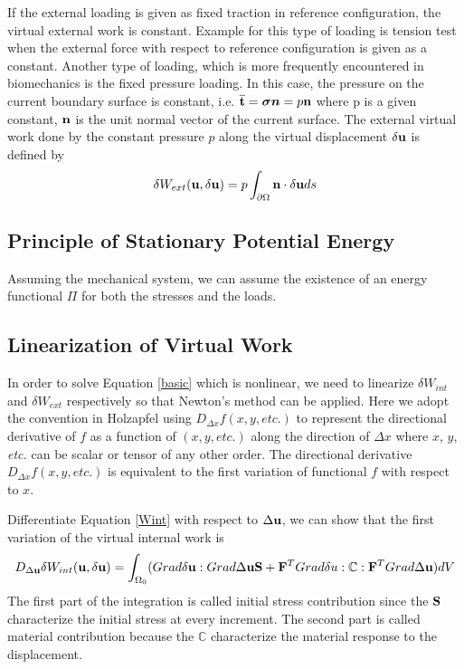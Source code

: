 If the external loading is given as fixed traction in reference configuration, the virtual external work is constant. Example for this type of loading is tension test when the external force with respect to reference configuration is given as a constant. Another type of loading, which is more frequently encountered in biomechanics is the fixed pressure loading.
In this case, the pressure on the current boundary surface is constant, i.e. $\overline{\bold{t}} = \boldsymbol{\sigma{n}} = p\bold{n}$ where p is a given constant, $\bold{n}$ is the unit normal vector of the current surface. The external virtual work done by the constant pressure $p$ along the virtual displacement $\delta{\bold{u}}$ is defined by
\begin{equation} \label{Wext2}
\delta{W_{ext}}(\bold{u}, \delta{\bold{u}}) = p\int_{\partial\Omega} \bold{n}\cdot\delta{\bold{u}}ds
\end{equation}
%
\subsection{Principle of Stationary Potential Energy}
Assuming the mechanical system, we can assume the existence of an energy functional $\Pi$ for both the stresses and the loads.













\subsection{Linearization of Virtual Work}
In order to solve Equation \ref{basic} which is nonlinear, we need to linearize $\delta{W_{int}}$ and $\delta{W_{ext}}$ respectively so that Newton's method can be applied. Here we adopt the convention in Holzapfel using $D_{\Delta{x}}f(x, y, \textit{etc.})$ to represent the directional derivative of $f$ as a function of $(x, y, \textit{etc.})$ along the direction of $\Delta{x}$ where $x$, $y$, \textit{etc.} can be scalar or tensor of any other order. The directional derivative $D_{\Delta{x}}f(x, y, \textit{etc.})$ is equivalent to the first variation of functional $f$ with respect to $x$.

Differentiate Equation \ref{Wint} with respect to $\Delta{\bold{u}}$, we can show that the first variation of the virtual internal work is
\begin{equation} \label{Kint}
D_{\Delta{\bold{u}}}\delta{W_{int}}(\bold{u}, \delta{\bold{u}}) = \int_{\Omega_0}(Grad\delta\bold{u} : Grad\Delta\bold{u}\bold{S} + \bold{F}^TGrad\delta{u} : \mathbb{C} : \bold{F}^T Grad\Delta\bold{u})dV
\end{equation}
The first part of the integration is called initial stress contribution since the $\bold{S}$ characterize the initial stress at every increment. The second part is called material contribution because the $\mathbb{C}$ characterize the material response to the displacement.

